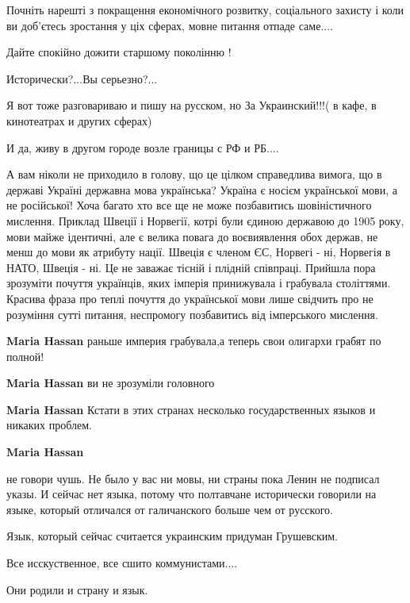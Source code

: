 \begin{itemize}
Почніть нарешті з покращення економічного розвитку, соціального захисту і коли
ви доб'єтесь зростання у ціх сферах, мовне питання отпаде саме....

Дайте спокійно дожити старшому поколінню !



Исторически?...Вы серьезно?...

Я вот тоже разговариваю и пишу на русском, но За Украинский!!!( в кафе, в
кинотеатрах и других сферах)

И да, живу в другом городе возле границы с РФ и РБ....


А вам ніколи не приходило в голову, що це цілком справедлива вимога, що в
державі Україні державна мова українська? Україна є носієм української мови, а
не російської! Хоча багато хто все ще не може позбавитись шовіністичного
мислення. Приклад Швеції і Норвегії, котрі були єдиною державою до 1905 року,
мови майже ідентичні, але є велика повага до воєвиявлення обох держав, не менш
до мови як атрибуту нації. Швеція є членом ЄС, Норвегі - ні, Норвегія в НАТО,
Швеція - ні. Це не заважає тісній і плідній співпраці. Прийшла пора зрозуміти
почуття українців, яких імперія принижувала і грабувала століттями. Красива
фраза про теплі почуття до української мови лише свідчить про не розуміння
сутті питання, неспромогу позбавитись від імперського мислення.

\begin{itemize}

\textbf{Maria Hassan} раньше империя грабувала,а теперь свои олигархи грабят по полной!

\textbf{Maria Hassan} ви не зрозуміли головного

\textbf{Maria Hassan} Кстати в этих странах несколько государственных языков и никаких проблем.

\textbf{Maria Hassan} 

не говори чушь. Не было у вас ни мовы, ни страны пока Ленин не подписал указы.
И сейчас нет языка, потому что полтавчане исторически говорили на языке,
который отличался от галичанского больше чем от русского.

Язык, который сейчас считается украинским придуман Грушевским.

Все исскуственное, все сшито коммунистами....

Они родили и страну и язык.


\end{itemize}
\end{itemize}
